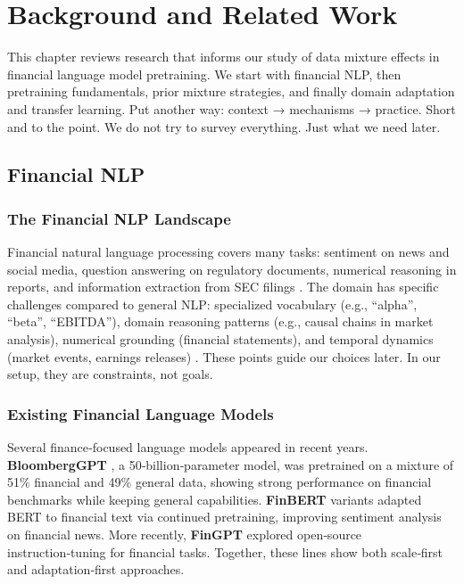 \chapter{Background and Related Work}

This chapter reviews research that informs our study of data mixture effects in financial language model pretraining. We start with financial NLP, then pretraining fundamentals, prior mixture strategies, and finally domain adaptation and transfer learning. Put another way: context → mechanisms → practice. Short and to the point. We do not try to survey everything. Just what we need later.

\section{Financial NLP}

\subsection{The Financial NLP Landscape}

Financial natural language processing covers many tasks: sentiment on news and social media, question answering on regulatory documents, numerical reasoning in reports, and information extraction from SEC filings \parencite{araci2019finbert, chen2021finqa}. The domain has specific challenges compared to general NLP: specialized vocabulary (e.g., ``alpha'', ``beta'', ``EBITDA''), domain reasoning patterns (e.g., causal chains in market analysis), numerical grounding (financial statements), and temporal dynamics (market events, earnings releases) \parencite{wu2023bloomberggpt, araci2019finbert}. These points guide our choices later. In our setup, they are constraints, not goals.

\subsection{Existing Financial Language Models}

Several finance‑focused language models appeared in recent years. \textbf{BloombergGPT} \parencite{wu2023bloomberggpt}, a 50‑billion‑parameter model, was pretrained on a mixture of 51\% financial and 49\% general data, showing strong performance on financial benchmarks while keeping general capabilities. \textbf{FinBERT} variants \parencite{araci2019finbert, yang2020finbert} adapted BERT to financial text via continued pretraining, improving sentiment analysis on financial news. More recently, \textbf{FinGPT} \parencite{yang2023fingpt} explored open‑source instruction‑tuning for financial tasks. Together, these lines show both scale‑first and adaptation‑first approaches.

